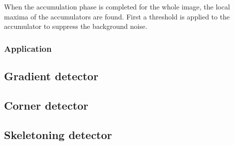When the accumulation phase is completed for the whole image, the local maxima of the accumulators are found.
First a threshold is applied to the accumulator to suppress the background noise.

\subsubsection{Application}

\subsection{Gradient detector}



\subsection{Corner detector}



\subsection{Skeletoning detector}


